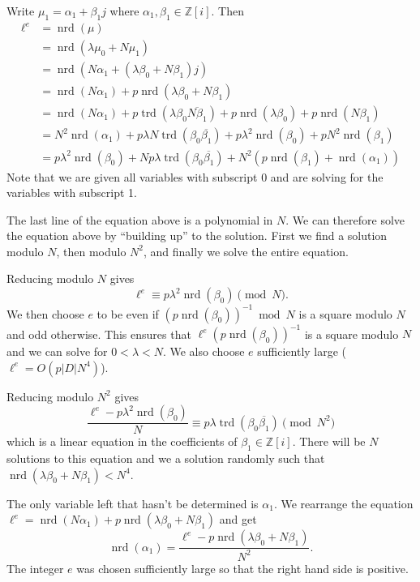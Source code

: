\documentclass[10pt]{article}
\theoremstyle{plain}
\theoremstyle{definition}
\newcommand{\op}{\operatorname}
\newcommand{\Z}{\mathbb{Z}}
\newcommand{\nrd}{\op{nrd}}
\newcommand{\trd}{\op{trd}}
\begin{document}
Write \( \mu_1 = \alpha_1 + \beta_1j \) where \( \alpha_1, \beta_1 \in \Z[i] \).
Then
\begin{align*}
    \ell^e
      & = \nrd(\mu)                                                                                                      \\
      & = \nrd(\lambda \mu_0 + N \mu_1)                                                                                  \\
      & = \nrd(N\alpha_1 + (\lambda\beta_0 + N\beta_1)j)                                                                 \\
      & = \nrd(N\alpha_1) +p\nrd(\lambda\beta_0 + N\beta_1)                                                              \\
      & = \nrd(N\alpha_1) + p\trd(\lambda \beta_0\overline{N\beta_1}) + p\nrd(\lambda\beta_0) + p\nrd(N\beta_1)          \\
      & = N^2\nrd(\alpha_1) +  p\lambda N \trd(\beta_0\overline{\beta_1}) + p\lambda^2 \nrd(\beta_0) + pN^2\nrd(\beta_1) \\
      & = p\lambda^2 \nrd(\beta_0) + Np\lambda \trd(\beta_0\overline{\beta_1}) + N^2(p\nrd(\beta_1) + \nrd(\alpha_1))
\end{align*}
Note that we are given all variables with subscript 0 and are solving for the variables with subscript 1.

The last line of the equation above is a polynomial in \( N \).
We can therefore solve the equation above by ``building up'' to the solution.
First we find a solution modulo \( N \), then modulo \( N^2 \), and finally we solve the entire equation.

Reducing modulo \( N \) gives
\[
    \ell^e \equiv p\lambda^2\nrd(\beta_0) \pmod{N}.
\]
We then choose \( e \) to be even if \( (p\nrd(\beta_0))^{-1} \bmod{N} \) is a square modulo \( N \) and odd otherwise.
This ensures that \( \ell^e(p\nrd(\beta_0))^{-1} \) is a square modulo \( N \) and we can solve for \( 0 <  \lambda < N\).
We also choose \( e \) sufficiently large (\( \ell^e = O(p|D|N^4) \)).

Reducing modulo \( N^2 \) gives
\[
    \frac{\ell^e - p\lambda^2\nrd(\beta_0)}{N}\equiv p\lambda \trd(\beta_0\overline{\beta_1}) \pmod{N^2}
\]
which is a linear equation in the coefficients of \( \beta_1 \in \Z[i]\).
There will be \( N \) solutions to this equation and we a solution randomly such that \( \nrd(\lambda\beta_0 + N\beta_1) < N^4 \).

The only variable left that hasn't be determined is \( \alpha_1 \).
We rearrange the equation \( \ell^e = \nrd(N\alpha_1) +p\nrd(\lambda\beta_0 + N\beta_1) \) and get
\[
    \nrd(\alpha_1)
    = \frac{\ell^e - p\nrd(\lambda\beta_0 + N\beta_1)}{N^2}.
\]
The integer \( e \) was chosen sufficiently large so that the right hand side is positive.
\end{document}
